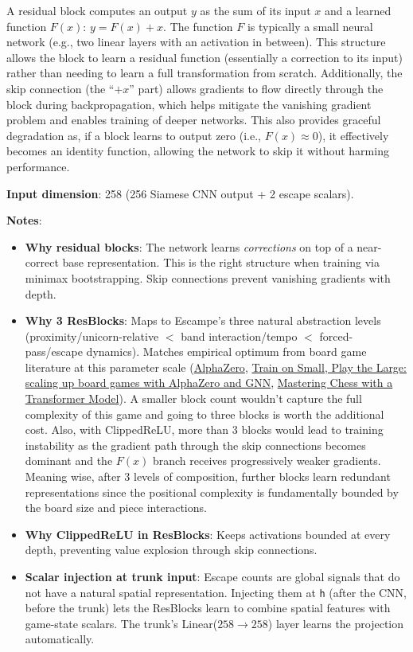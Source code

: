 \documentclass[11pt,a4paper]{article}
\begin{document}
A residual block computes an output $y$ as the sum of its input $x$ and a learned function $F(x)$: $y = F(x) + x$.
The function $F$ is typically a small neural network (e.g., two linear layers with an activation in between).
This structure allows the block to learn a residual function (essentially a correction to its input) rather than needing to learn a full transformation from scratch.
Additionally, the skip connection (the ``$+x$'' part) allows gradients to flow directly through the block during backpropagation, which helps mitigate the vanishing gradient problem and enables training of deeper networks.
This also provides graceful degradation as, if a block learns to output zero (i.e., $F(x) \approx 0$), it effectively becomes an identity function, allowing the network to skip it without harming performance.

\textbf{Input dimension}: 258 (256 Siamese CNN output + 2 escape scalars).

\newpage
\textbf{Notes}:
\begin{itemize}
  \item \textbf{Why residual blocks}: The network learns \emph{corrections} on top of a near-correct base representation. This is the right structure when training via minimax bootstrapping. Skip connections prevent vanishing gradients with depth.
  \item \textbf{Why 3 ResBlocks}: Maps to Escampe's three natural abstraction levels (proximity/unicorn-relative $<$ band interaction/tempo $<$ forced-pass/escape dynamics). Matches empirical optimum from board game literature at this parameter scale (\href{https://en.wikipedia.org/wiki/AlphaZero}{AlphaZero}, \href{https://arxiv.org/pdf/2107.08387}{Train on Small, Play the Large: scaling up board games with AlphaZero and GNN}, \href{https://arxiv.org/html/2409.12272v1#S6}{Mastering Chess with a Transformer Model}). A smaller block count wouldn't capture the full complexity of this game and going to three blocks is worth the additional cost. Also, with ClippedReLU, more than 3 blocks would lead to training instability as the gradient path through the skip connections becomes dominant and the $F(x)$ branch receives progressively weaker gradients. Meaning wise, after 3 levels of composition, further blocks learn redundant representations since the positional complexity is fundamentally bounded by the board size and piece interactions.
  \item \textbf{Why ClippedReLU in ResBlocks}: Keeps activations bounded at every depth, preventing value explosion through skip connections.
  \item \textbf{Scalar injection at trunk input}: Escape counts are global signals that do not have a natural spatial representation. Injecting them at \texttt{h} (after the CNN, before the trunk) lets the ResBlocks learn to combine spatial features with game-state scalars. The trunk's Linear($258\to258$) layer learns the projection automatically.
\end{itemize}
\end{document}
